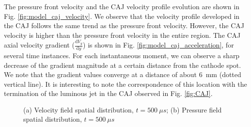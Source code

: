\documentclass[a4paper]{iacas}%
\begin{document}
The pressure front velocity and the CAJ velocity profile evolution are shown in Fig. \ref{fig:model_caj_velocity}. We observe that the velocity profile developed in the CAJ  follows the same trend as the pressure front velocity. However, the CAJ velocity is higher than the pressure front velocity in the entire region. The CAJ axial velocity gradient ($\frac{\mathrm{d}V_y}{\mathrm{d}y}$) is shown in Fig. \ref{fig:model_caj_acceleration}, for several time instances. For each instantaneous moment, we can observe a sharp decrease of the gradient magnitude at a certain distance from the cathode spot. We note that the gradient values converge at a distance of about 6~mm (dotted vertical line). It is interesting to note the correspondence of this location with the termination of the luminous jet in the CAJ observed in Fig. \ref{fig:CAJ}.
\begin{figure}
	\centering
	
	
	\caption{(a) Velocity field spatial distribution, $ t = 500~\mu s $; (b) Pressure field spatial distribution, $ t = 500~\mu s $}
\end{figure}
\end{document}

